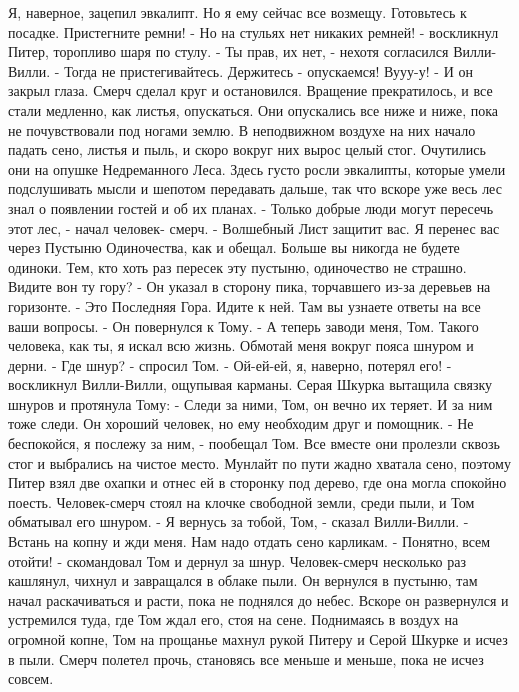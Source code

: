 Я, наверное, зацепил эвкалипт. Но я ему сейчас все возмещу. Готовьтесь 
к посадке. Пристегните ремни!
    - Но на стульях нет никаких ремней! - воскликнул Питер, торопливо 
шаря по стулу.
    - Ты прав, их нет, - нехотя согласился Вилли-Вилли. - Тогда не 
пристегивайтесь. Держитесь - опускаемся! Вууу-у! - И он закрыл глаза.
    Смерч сделал круг и остановился. Вращение прекратилось, и все 
стали медленно, как листья, опускаться. Они опускались все ниже и 
ниже, пока не почувствовали под ногами землю. В неподвижном воздухе на 
них начало падать сено, листья и пыль, и скоро вокруг них вырос целый 
стог.
    Очутились они на опушке Недреманного Леса. Здесь густо росли 
эвкалипты, которые умели подслушивать мысли и шепотом передавать 
дальше, так что вскоре уже весь лес знал о появлении гостей и об их 
планах.
    - Только добрые люди могут пересечь этот лес, - начал человек-
смерч. - Волшебный Лист защитит вас. Я перенес вас через Пустыню 
Одиночества, как и обещал. Больше вы никогда не будете одиноки. Тем, 
кто хоть раз пересек эту пустыню, одиночество не страшно. Видите вон 
ту гору? - Он указал в сторону пика, торчавшего из-за деревьев на 
горизонте. - Это Последняя Гора. Идите к ней. Там вы узнаете ответы на 
все ваши вопросы. - Он повернулся к Тому. - А теперь заводи меня, Том. 
Такого человека, как ты, я искал всю жизнь. Обмотай меня вокруг пояса 
шнуром и дерни.
    - Где шнур? - спросил Том.
    - Ой-ей-ей, я, наверно, потерял его! - воскликнул Вилли-Вилли, 
ощупывая карманы.
    Серая Шкурка вытащила связку шнуров и протянула Тому:
    - Следи за ними, Том, он вечно их теряет. И за ним тоже следи. Он 
хороший человек, но ему необходим друг и помощник.
    - Не беспокойся, я послежу за ним, - пообещал Том.
    Все вместе они пролезли сквозь стог и выбрались на чистое место. 
Мунлайт по пути жадно хватала сено, поэтому Питер взял две охапки и 
отнес ей в сторонку под дерево, где она могла спокойно поесть.
    Человек-смерч стоял на клочке свободной земли, среди пыли, и Том 
обматывал его шнуром.
    - Я вернусь за тобой, Том, - сказал Вилли-Вилли. - Встань на копну 
и жди меня. Нам надо отдать сено карликам.
    - Понятно, всем отойти! - скомандовал Том и дернул за шнур. 
Человек-смерч несколько раз кашлянул, чихнул и завращался в облаке 
пыли. Он вернулся в пустыню, там начал раскачиваться и расти, пока не 
поднялся до небес. Вскоре он развернулся и устремился туда, где Том 
ждал его, стоя на сене. Поднимаясь в воздух на огромной копне, Том на 
прощанье махнул рукой Питеру и Серой Шкурке и исчез в пыли. Смерч 
полетел прочь, становясь все меньше и меньше, пока не исчез совсем.
